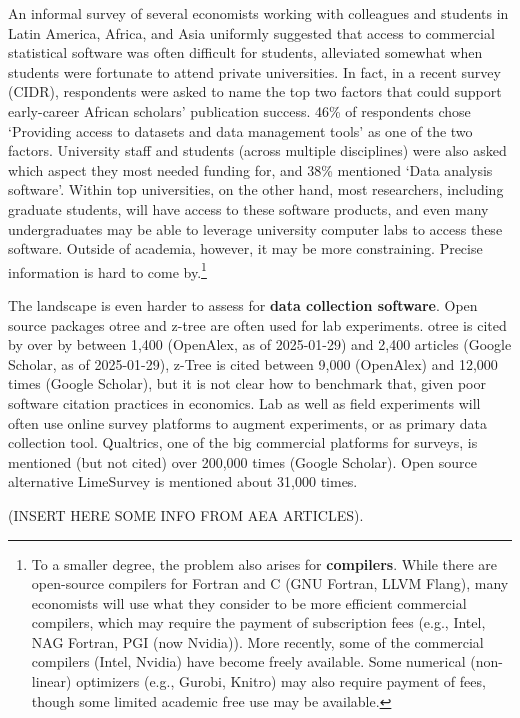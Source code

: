 \documentclass{article}
\begin{document}
An informal survey of several economists working with colleagues and students in Latin America, Africa, and Asia uniformly suggested that access to commercial statistical software was often difficult for students, alleviated somewhat when students were fortunate to attend private universities. In fact, in a recent survey (CIDR), respondents were asked to name the top two factors that could support early-career African scholars’ publication success. 46\% of respondents chose 
`Providing access to datasets and data management tools' as one of the two factors. University staff and students (across multiple disciplines) were also asked which aspect they  most needed funding for, and 38\% mentioned `Data analysis software'. Within top universities, on the other hand, most researchers, including graduate students, will have access to these software products, and even many undergraduates may be able to leverage university computer labs to access these software. Outside of academia, however, it may be more constraining. Precise information is hard to come by.\footnote{To a smaller degree, the problem also arises for \textbf{compilers}. While there are open-source compilers for Fortran and C (GNU Fortran, LLVM Flang), many economists will use what they consider to be more efficient commercial compilers, which may require the payment of  subscription fees (e.g., Intel, NAG Fortran, PGI (now Nvidia)). More recently, some of the commercial compilers (Intel, Nvidia) have become freely available. Some numerical (non-linear) optimizers (e.g., Gurobi, Knitro) may also require payment of fees, though some limited academic free use may be available.}

The landscape is even harder to assess for \textbf{data collection software}. Open source packages otree and z-tree are often used for lab experiments. otree is cited by over by between 1,400 (OpenAlex, as of 2025-01-29) and 2,400 articles (Google Scholar, as of 2025-01-29), z-Tree is cited between 9,000 (OpenAlex) and 12,000 times (Google Scholar), but it is not clear how to benchmark that, given poor software citation practices in economics. Lab as well as field experiments will often use online survey platforms to augment experiments, or as primary data collection tool. Qualtrics, one of the big commercial platforms for surveys, is mentioned (but not cited) over 200,000 times (Google Scholar). Open source alternative LimeSurvey is mentioned about 31,000 times.

(INSERT HERE SOME INFO FROM AEA ARTICLES). 
\end{document}
